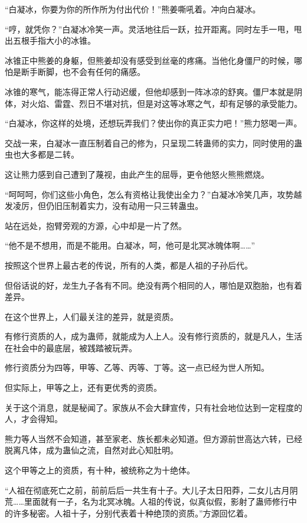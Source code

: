 \begin{this_body}
“白凝冰，你要为你的所作所为付出代价！”熊姜嘶吼着。冲向白凝冰。

“哼，就凭你？”白凝冰冷笑一声。灵活地往后一跃，拉开距离。同时左手一甩，甩出五根手指大小的冰锥。

冰锥正中熊姜的身躯，但熊姜却没有感受到丝毫的疼痛。当他化身僵尸的时候，哪怕是断手断脚，也不会有任何的痛感。

冰锥的寒气，能冻得正常人行动迟缓，但他却感到一阵冰凉的舒爽。僵尸本就是阴体，对火焰、雷霆、烈日不堪对抗，但是对这等冰寒之气，却有足够的承受能力。

“白凝冰，你这样的处境，还想玩弄我们？使出你的真正实力吧！”熊力怒喝一声。

交战一来，白凝冰一直压制着自己的修为，只呈现二转蛊师的实力，同时使用的蛊虫也大多都是二转。

这让熊力感到自己遭到了蔑视，由此产生的屈辱，更令他怒火熊熊燃烧。

“呵呵呵，你们这些小角色，怎么有资格让我使出全力？”白凝冰冷笑几声，攻势越发凌厉，但仍旧压制着实力，没有动用一只三转蛊虫。

站在远处，抱臂旁观的方源，心中却是一片了然。

“他不是不想用，而是不能用。白凝冰，呵，他可是北冥冰魄体啊……”

按照这个世界上最古老的传说，所有的人类，都是人祖的子孙后代。

但俗话说的好，龙生九子各有不同。绝没有两个相同的人，哪怕是双胞胎，也有着差异。

在这个世界上，人们最关注的差异，就是资质。

有修行资质的人，成为蛊师，就能成为人上人。没有修行资质的，就是凡人，生活在社会中的最底层，被践踏被玩弄。

修行资质分为四等，甲等、乙等、丙等、丁等。这一点已经为世人所知。

但实际上，甲等之上，还有更优秀的资质。

关于这个消息，就是秘闻了。家族从不会大肆宣传，只有社会地位达到一定程度的人，才会得知。

熊力等人当然不会知道，甚至家老、族长都未必知道。但方源前世高达六转，已经脱离凡体，成为蛊仙之流，自然对此心知肚明。

这个甲等之上的资质，有十种，被统称之为十绝体。

“人祖在彻底死亡之前，前前后后一共生有十子。大儿子太日阳莽，二女儿古月阴荒……里面就有一子，名为北冥冰魄。人祖的传说，似真似假，影射了蛊师修行中的许多秘密。人祖十子，分别代表着十种绝顶的资质。”方源回忆着。


\end{this_body}
